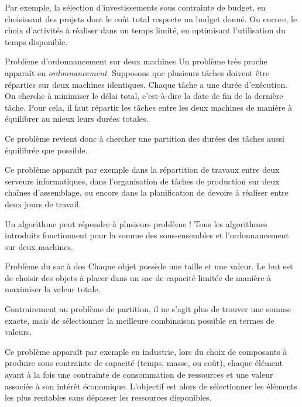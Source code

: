 \documentclass[a4paper,twoside]{article}
\begin{document}
Par exemple, la sélection d'investissements sous contrainte de budget, en choisissant des projets dont le coût total respecte un budget donné.
Ou encore, le choix d'activités à réaliser dans un temps limité, en optimisant l'utilisation du temps disponible.

\begin{definition}{Problème d'ordonnancement sur deux machines}
  Un problème très proche apparaît en \emph{ordonnancement}.
  Supposons que plusieurs tâches doivent être réparties sur deux machines identiques.
  Chaque tâche a une durée d'exécution.
  On cherche à minimiser le délai total, c'est-à-dire la date de fin de la dernière tâche.
  Pour cela, il faut répartir les tâches entre les deux machines de manière à équilibrer au mieux leurs durées totales.

  Ce problème revient donc à chercher une partition des durées des tâches aussi équilibrée que possible.
\end{definition}

Ce problème apparaît par exemple dans la répartition de travaux entre deux serveurs informatiques, dans l'organisation de tâches de production sur deux chaînes d'assemblage, ou encore dans la planification de devoirs à réaliser entre deux jours de travail.

\begin{remarque}{Un algorithme peut répondre à plusieurs problème !}
  Tous les algorithmes introduits fonctionnent pour la somme des sous-ensembles et l'ordonnancement sur deux machines.
\end{remarque}


\begin{definition}{Problème du sac à dos}
  Chaque objet possède une taille et une valeur.
  Le but est de choisir des objets à placer dans un sac de capacité limitée de manière à maximiser la valeur totale.

  Contrairement au problème de partition, il ne s'agit plus de trouver une somme exacte, mais de sélectionner la meilleure combinaison possible en termes de valeurs.
\end{definition}

Ce problème apparaît par exemple en industrie, lors du choix de composants à produire sous contrainte de capacité (temps, masse, ou coût), chaque élément ayant à la fois une contrainte de consommation de ressources et une valeur associée à son intérêt économique. L'objectif est alors de sélectionner les éléments les plus rentables sans dépasser les ressources disponibles.
\end{document}
